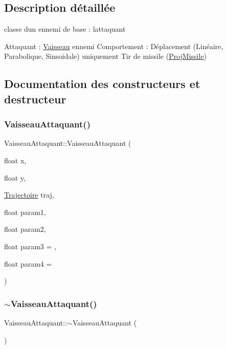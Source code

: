 \subsection{Description détaillée}
classe d\textquotesingle{}un ennemi de base \+: l\textquotesingle{}attaquant 

Attaquant \+: \hyperlink{class_vaisseau}{Vaisseau} ennemi Comportement \+: Déplacement (Linéaire, Parabolique, Sinsoidale) uniquement Tir de missile (\hyperlink{class_proj_missile}{Proj\+Missile}) 

\subsection{Documentation des constructeurs et destructeur}
\mbox{\label{class_vaisseau_attaquant_a58fd4ab933dd101db82b9287e0c0aafa}} 
\subsubsection{\texorpdfstring{Vaisseau\+Attaquant()}{VaisseauAttaquant()}}
{\footnotesize\ttfamily Vaisseau\+Attaquant\+::\+Vaisseau\+Attaquant (\begin{DoxyParamCaption}\item[{float}]{x,  }\item[{float}]{y,  }\item[{\hyperlink{_trajectoire_8h_afa7f6e8323d7ee755d93cd1f6019dd95}{Trajectoire}}]{traj,  }\item[{float}]{param1,  }\item[{float}]{param2,  }\item[{float}]{param3 = {},  }\item[{float}]{param4 = {} }\end{DoxyParamCaption})}

\mbox{\label{class_vaisseau_attaquant_a2707dcc90692ba6132ec6aeb659d3620}} 
\subsubsection{\texorpdfstring{$\sim$\+Vaisseau\+Attaquant()}{~VaisseauAttaquant()}}
{\footnotesize\ttfamily Vaisseau\+Attaquant\+::$\sim$\+Vaisseau\+Attaquant (\begin{DoxyParamCaption}{ }\end{DoxyParamCaption})}



